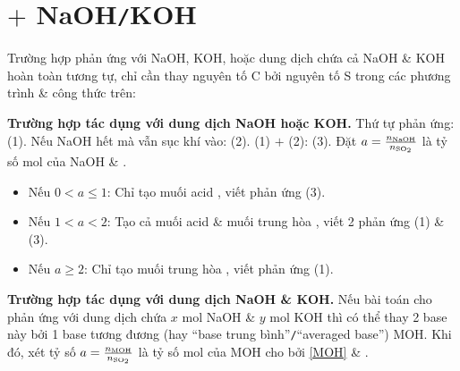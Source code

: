 \documentclass{article}
\begin{document}
\section{ $+$ NaOH{\tt/}KOH}
Trường hợp  phản ứng với NaOH, KOH, hoặc dung dịch chứa cả NaOH \& KOH hoàn toàn tương tự, chỉ cần thay nguyên tố C bởi nguyên tố S trong các phương trình \& công thức trên:
\vspace{2mm}

\noindent\textbf{\textsf{Trường hợp  tác dụng với dung dịch NaOH hoặc KOH.}} Thứ tự phản ứng:  (1). Nếu NaOH hết mà vẫn sục khí  vào:  (2). (1) $+$ (2):  (3). Đặt $a = \frac{n_{\rm NaOH}}{n_{\ce{SO2}}}$ là tỷ số mol của NaOH \& .
\begin{itemize}
	\item Nếu $0 < a\le 1$: Chỉ tạo muối acid , viết phản ứng (3).
	\item Nếu $1 < a < 2$: Tạo cả muối acid  \& muối trung hòa , viết 2 phản ứng (1) \& (3).
	\item Nếu $a\ge 2$: Chỉ tạo muối trung hòa , viết phản ứng (1).
\end{itemize}
\textbf{\textsf{Trường hợp  tác dụng với dung dịch NaOH \& KOH.}} Nếu bài toán cho  phản ứng với dung dịch chứa $x$ mol NaOH \& $y$ mol KOH thì có thể thay 2 base này bởi 1 base tương đương (hay ``base trung bình''{\tt/}``averaged base'') MOH. Khi đó, xét tỷ số $a = \frac{n_{\rm MOH}}{n_{\ce{SO2}}}$ là tỷ số mol của MOH cho bởi \eqref{MOH} \& .

\end{document}

